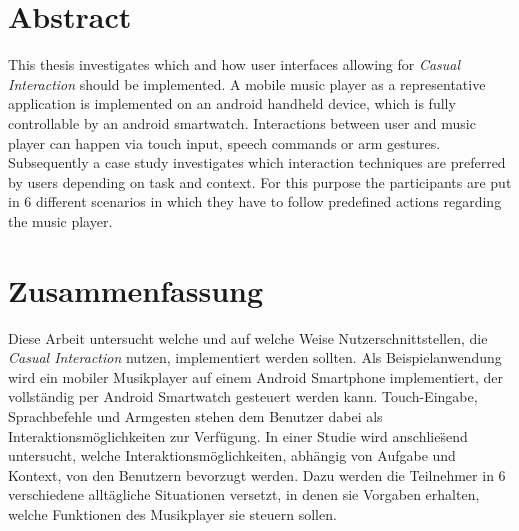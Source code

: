 \begingroup
\let\clearpage\relax
\let\cleardoublepage\relax
\let\cleardoublepage\relax

\chapter*{Abstract}
This thesis investigates which and how user interfaces allowing for \textit{Casual Interaction} should be implemented. A mobile music player as a representative application is implemented on an android handheld device, which is fully controllable by an android smartwatch. Interactions between user and music player can happen via touch input, speech commands or arm gestures. Subsequently a case study investigates which interaction techniques are preferred by users depending on task and context. For this purpose the participants are put in 6 different scenarios in which they have to follow predefined actions regarding the music player.


\vfill

\chapter*{Zusammenfassung}
Diese Arbeit untersucht welche und auf welche Weise Nutzerschnittstellen, die \textit{Casual Interaction} nutzen, implementiert werden sollten. Als Beispielanwendung wird ein mobiler Musikplayer auf einem Android Smartphone implementiert, der vollst\"andig per Android Smartwatch gesteuert werden kann. Touch-Eingabe, Sprachbefehle und Armgesten stehen dem Benutzer dabei als Interaktionsm\"oglichkeiten zur Verf\"ugung. In einer Studie wird anschlie\"send untersucht, welche Interaktionsm\"oglichkeiten, abh\"angig von Aufgabe und Kontext, von den Benutzern bevorzugt werden. Dazu werden die Teilnehmer in 6 verschiedene allt\"agliche Situationen versetzt, in denen sie Vorgaben erhalten, welche Funktionen des Musikplayer sie steuern sollen.


\endgroup			

\vfill